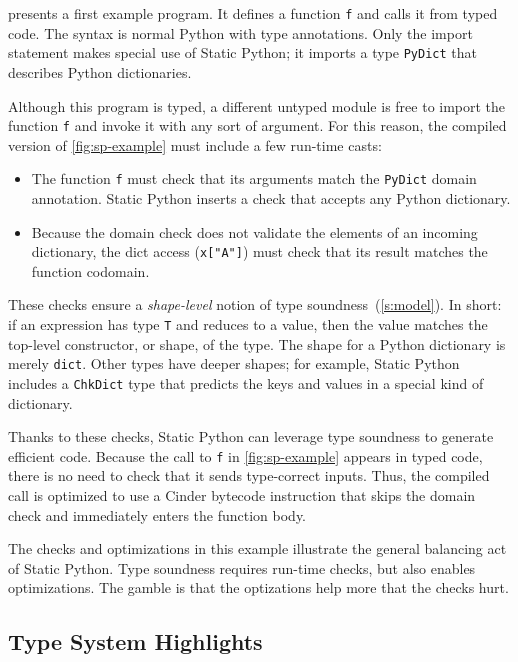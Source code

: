 \documentclass[english,cleveref,submission]{programming}
\newcommand{\SP}{Static Python}
\newcommand{\code}[1]{\texttt{#1}}
\begin{document}
 presents a first example program.
It defines a function \code{f} and calls it from typed code.
The syntax is normal Python with type annotations.
Only the import statement makes special use of \SP{};
it imports a type \code{PyDict} that describes Python dictionaries.

Although this program is typed, a different untyped module is free
to import the function \code{f} and invoke it with any sort of
argument.
For this reason, the compiled version of \cref{fig:sp-example} must
include a few run-time casts:
\begin{itemize}
  \item
    The function \code{f} must check that its arguments match the \code{PyDict} domain annotation.
    \SP{} inserts a check that accepts any Python dictionary.
  \item
    Because the domain check does not validate the elements of an incoming dictionary,
    the dict access (\code{x["A"]}) must check that its result matches the function codomain.
\end{itemize}
These checks ensure a \emph{shape-level} notion of type soundness~(\cref{s:model}).
In short: if an expression has type \code{T} and reduces to a value, then the value
matches the top-level constructor, or shape, of the type.
The shape for a Python dictionary is merely \code{dict}.
Other types have deeper shapes; for example, \SP{} includes a \code{ChkDict}
type that predicts the keys and values in a special kind of dictionary.

Thanks to these checks, \SP{} can leverage type soundness to generate efficient code.
Because the call to \code{f} in \cref{fig:sp-example} appears in typed code,
there is no need to check that it sends type-correct inputs.
Thus, the compiled call is optimized to use a Cinder bytecode instruction
that skips the domain check and immediately enters the function body.

The checks and optimizations in this example illustrate the general balancing act
of \SP{}.
Type soundness requires run-time checks, but also enables optimizations.
The gamble is that the optizations help more that the checks hurt.


\subsection{Type System Highlights}
\end{document}
